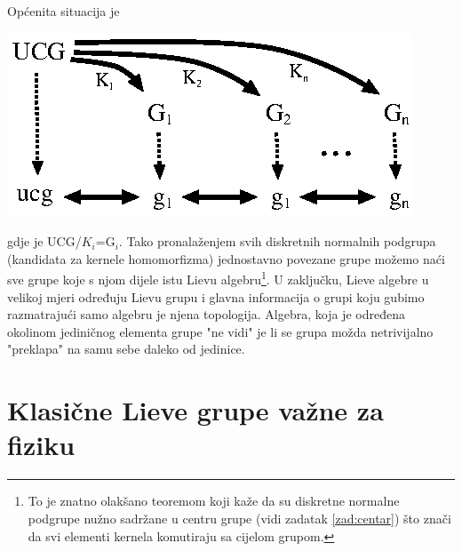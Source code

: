 Općenita situacija je\\[1ex]

\centerline{\includegraphics[scale=1.0]{pics/ucg.eps}}

gdje je UCG/$K_i$=G$_i$. Tako pronalaženjem svih diskretnih normalnih
podgrupa (kandidata za kernele homomorfizma) jednostavno povezane grupe 
možemo naći sve grupe koje
s njom dijele istu Lievu algebru\footnote{To je znatno olakšano teoremom
koji kaže da su diskretne normalne podgrupe nužno sadržane u
centru grupe (vidi zadatak \ref{zad:centar}) što znači da svi elementi
kernela komutiraju sa cijelom grupom.}.
U zaključku, Lieve algebre u velikoj mjeri određuju Lievu grupu i
glavna informacija o grupi koju gubimo razmatrajući samo algebru
je njena topologija. Algebra, koja je određena okolinom jediničnog
elementa grupe "ne vidi" je li se grupa možda netrivijalno "preklapa"
na samu sebe daleko od jedinice.


\section{Klasične Lieve grupe važne za fiziku}
\label{sec:primjeriLie}


